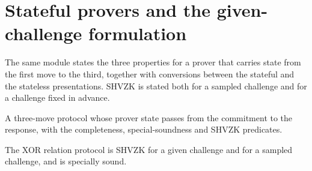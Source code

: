 \section{Stateful provers and the given-challenge formulation}

The same module states the three properties for a prover that carries state from
the first move to the third, together with conversions between the stateful and
the stateless presentations. SHVZK is stated both for a sampled
challenge and for a challenge fixed in advance.

\begin{definition}
  \label{def:sigma-stateful}
  \leanok
  A three-move protocol whose prover state passes from the commitment to the
  response, with the completeness, special-soundness and SHVZK predicates.
\end{definition}

\begin{theorem}
  \label{thm:sigma-stateful-xor}
  \leanok
  The XOR relation protocol is SHVZK for a given challenge and for a sampled
  challenge, and is specially sound.
\end{theorem}
